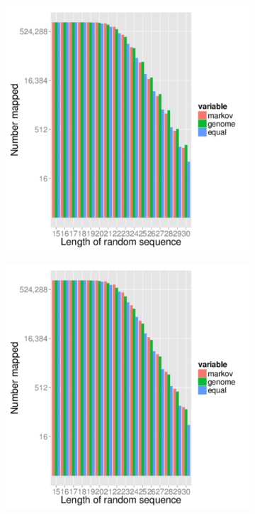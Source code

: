 \documentclass{article}
\begin{document}
\begin{figure}
   \centering
   \begin{subfigure}{.5\textwidth}
      \centering
      \includegraphics[width=.9\textwidth,natwidth=100,natheight=100]{hg38_mapped_1000000.pdf}
      \caption{}
      \label{fig:hg38_mapped}
   \end{subfigure}%
   \begin{subfigure}{.5\textwidth}
      \centering
      \includegraphics[width=.9\textwidth,natwidth=100,natheight=100]{mm10_mapped_1000000.pdf}

\end{subfigure}
\end{figure}
\end{document}
